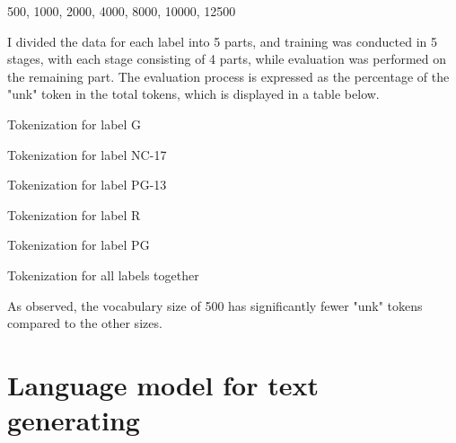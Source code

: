\documentclass[a4paper]{article}
\begin{document}
\begin{center}
    500, 1000, 2000, 4000, 8000, 10000, 12500
\end{center}

I divided the data for each label into 5 parts, and training was conducted in 5 stages, with each stage consisting of 4 parts, while evaluation was performed on the remaining part. The evaluation process is expressed as the percentage of the "unk" token in the total tokens, which is displayed in a table below.\\

\begin{table}[ht]
    \centering
    \caption{Tokenization for label G}
    \label{tab:data}
\end{table}

\begin{table}[ht]
    \centering
    \caption{Tokenization for label NC-17}
    \label{tab:data}
\end{table}

\begin{table}[ht]
    \centering
    \caption{Tokenization for label PG-13}
    \label{tab:data}
\end{table}

\begin{table}[ht]
    \centering
    \caption{Tokenization for label R}
    \label{tab:data}
\end{table}

\begin{table}[ht]
    \centering
    \caption{Tokenization for label PG}
    \label{tab:data}
\end{table}

\begin{table}[ht]
    \centering
    \caption{Tokenization for all labels together}
    \label{tab:data}
\end{table}

\FloatBarrier

As observed, the vocabulary size of 500 has significantly fewer "unk" tokens compared to the other sizes.

\section{Language model for text generating}
\end{document}
